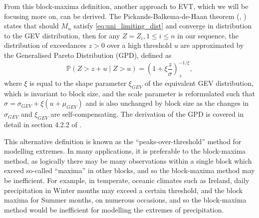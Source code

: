 \documentclass{article}
\numberwithin{equation}{section}
\begin{document}
From this block-maxima definition, another approach to EVT, which we will be focusing more on, can be derived.
The Pickands-Balkema-de-Haan theorem (\cite{Pickands1975}, \cite{Balkema1974}) states that should $M_n$ satisfy \ref{eq:uni_limiting_dist} and converge in distribution to the GEV distribution, then for any $Z = Z_i, 1 \le i \le n$ in our sequence, the distribution of exceedances $z > 0$ over a high threshold $u$ are approximated by the Generalised Pareto Distribution (GPD), defined as
\begin{equation} \label{eq:gpd}
  \mathbb{P}(Z > z + u \mid Z > u) = \left(1 + \xi \frac{z}{\sigma} \right)_{+}^{-1/\xi},
\end{equation}
where $\xi$ is equal to the shape parameter $\xi_{GEV}$ of the equivalent GEV distribution, which is invariant to block size, and the scale parameter is reformulated such that $\sigma = \sigma_{GEV} + \xi(u + \mu_{GEV})$ and is also unchanged by block size as the changes in $\sigma_{GEV}$ and $\xi_{GEV}$ are self-compensating. %
The derivation of the GPD is covered in detail in section 4.2.2 of \cite{Coles2001}. 

This alternative definition is known as the ``peaks-over-threshold'' method for modelling extremes. 
In many applications, it is preferable to the block-maxima method, as logically there may be many observations within a single block which exceed so-called ``maxima'' in other blocks, and so the block-maxima method may be inefficient.
For example, in temperate, oceanic climates such as Ireland, daily precipitation in Winter months may exceed a certain threshold, and the block maxima for Summer months, on numerous occasions, and so the block-maxima method would be inefficient for modelling the extremes of precipitation.

\end{document}
